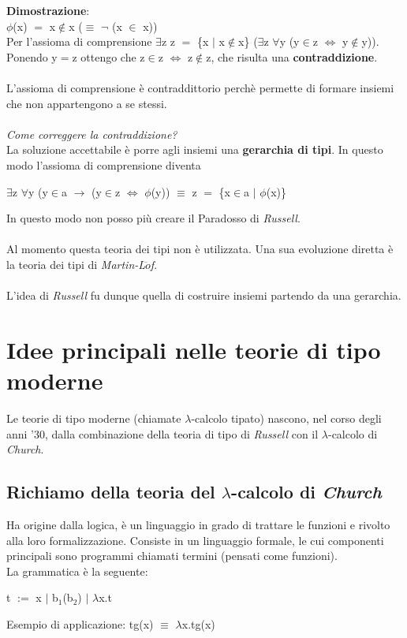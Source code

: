 \noindent \textbf{Dimostrazione}:\\
$\phi$(x) $=$ x$\notin$x ($\equiv$ $\neg$ (x $\in$ x))\\
Per l'assioma di comprensione	$\exists$z z $=$ \{x $|$ x$\notin$x\} ($\exists$z $\forall$y (y$\in$z $\Leftrightarrow$ y$\notin$y)).\\
Ponendo y$=$z ottengo che z$\in$z $\Leftrightarrow$ z$\notin$z, che risulta una \textbf{contraddizione}.\\\\
L'assioma di comprensione \`e contraddittorio perch\`e permette di formare insiemi che non appartengono a se stessi.\\\\
\textit{Come correggere la contraddizione?}\\
La soluzione accettabile \`e porre agli insiemi una \textbf{gerarchia di tipi}. In questo modo l'assioma di comprensione diventa\\
\begin{center}$\exists$z $\forall$y (y$\in$a $\to$ (y$\in$z $\Leftrightarrow$ $\phi$(y)) $\equiv$ z $=$ \{x$\in$a $\big|$ $\phi$(x)\}\end{center}
\noindent
In questo modo non posso pi\`u creare il Paradosso di \textit{Russell}.\\\\
Al momento questa teoria dei tipi non \`e utilizzata. Una sua evoluzione diretta \`e 
la teoria dei tipi di \textit{Martin-L$\ddot{o}$f}.\\\\
L'idea di \textit{Russell} fu dunque quella di costruire insiemi partendo da una gerarchia.

\section{Idee principali nelle teorie di tipo moderne}
\label{sec:idee-teorie-moderne}
Le teorie di tipo moderne (chiamate $\lambda$-calcolo tipato) nascono, nel corso degli anni '30, dalla combinazione della teoria di tipo di \textit{Russell} con il $\lambda$-calcolo di \textit{Church}.

\subsection{Richiamo della teoria del $\lambda$-calcolo di \textit{Church}}
\label{subsec:lambda-calcolo}
Ha origine dalla logica, \`e un linguaggio in grado di trattare le funzioni e rivolto alla loro formalizzazione. Consiste in un linguaggio formale, le cui componenti principali sono programmi chiamati termini (pensati come funzioni).\\ La grammatica \`e la seguente:
\begin{center} t $:=$ x $|$ b$_1$(b$_2$) $|$ $\lambda$x.t \end{center}
Esempio di applicazione: tg(x) $\equiv$ $\lambda$x.tg(x)

